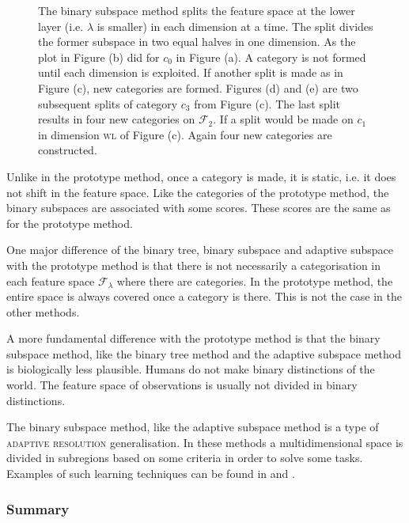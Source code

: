 \begin{figure}
\caption{The binary subspace method splits the feature space at the lower layer (i.e. $\lambda$ is smaller) in each dimension at a time. The split divides the former subspace in two equal halves in one dimension. As the plot in Figure (b) did for $c_0$ in Figure (a). A category is not formed until each dimension is exploited. If another split is made as in Figure (c), new categories are formed. Figures (d) and (e) are two subsequent splits of category $c_3$ from Figure (c). The last split results in four new categories on ${\mathcal F}_2$. If a split would be made on $c_1$ in dimension {\scshape wl} of Figure (c). Again four new categories are constructed.}
\label{f:lg:subspace}
\end{figure}

Unlike in the prototype method, once a category is made, it is static, i.e. it does not shift in the feature space. Like the categories of the prototype method, the binary subspaces are associated with some scores. These scores are the same as for the prototype method. 

One major difference of the binary tree, binary subspace and adaptive subspace with the prototype method is that there is not necessarily a categorisation in each feature space ${\mathcal F}_\lambda$ where there are categories. In the prototype method, the entire space is always covered once a category is there. This is not the case in the other methods. 

A more fundamental difference with the prototype method is that the binary subspace method, like the binary tree method and the adaptive subspace method is biologically less plausible. Humans do not make binary distinctions of the world. The feature space of observations is usually not divided in binary distinctions.

The binary subspace method, like the adaptive subspace method \citep{dejong:2000} is a type of {\scshape adaptive resolution} generalisation. In these methods a multidimensional space is divided in subregions based on some criteria in order to solve some tasks. Examples of such learning techniques can be found in \citealt{chapmankaebling:1991} and \citealt{moore:1995}.

\subsubsection{Summary}

